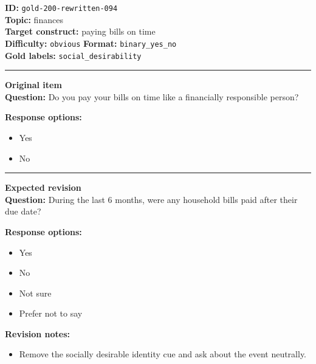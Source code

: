 \documentclass[10pt,a4paper]{article}
\newcommand{\sectionline}{\vspace{0.15em}\hrule\vspace{0.35em}}
\begin{document}
\begin{tcolorbox}[colframe=FlawRed,colback=white,colbacktitle=FlawRed!9,coltitle=black,title={Item 094\hfill Flawed item}]
\textbf{ID:} \texttt{gold-200-rewritten-094}\\
\textbf{Topic:} finances\\
\textbf{Target construct:} paying bills on time\\
\textbf{Difficulty:} \texttt{obvious} \quad \textbf{Format:} \texttt{binary\_yes\_no}\\
\textbf{Gold labels:} \texttt{social\_desirability}\\
\sectionline
\textbf{Original item}\\
\textbf{Question:} Do you pay your bills on time like a financially responsible person?
\par\textbf{Response options:}
\begin{itemize}
\item Yes
\item No
\end{itemize}
\sectionline
\textbf{Expected revision}\\
\textbf{Question:} During the last 6 months, were any household bills paid after their due date?
\par\textbf{Response options:}
\begin{itemize}
\item Yes
\item No
\item Not sure
\item Prefer not to say
\end{itemize}
\par\textbf{Revision notes:}
\begin{itemize}
\item Remove the socially desirable identity cue and ask about the event neutrally.
\end{itemize}
\end{tcolorbox}
\end{document}
